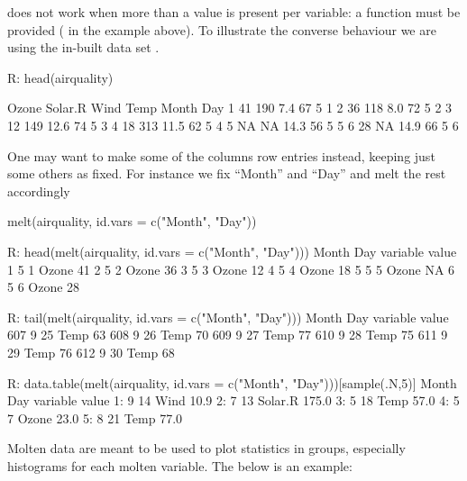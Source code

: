  does not work when more than a value is
present per variable: a function must be provided
( in the example above). To illustrate
the converse behaviour we are using the in-built 
data set .
\begin{example}
R: head(airquality)

  Ozone Solar.R Wind Temp Month Day
1    41     190  7.4   67     5   1
2    36     118  8.0   72     5   2
3    12     149 12.6   74     5   3
4    18     313 11.5   62     5   4
5    NA      NA 14.3   56     5   5
6    28      NA 14.9   66     5   6
\end{example}
One may want to make some of the columns row
entries instead, keeping just some others as
fixed. For instance we fix ``Month'' and 
``Day'' and melt the rest accordingly
\begin{example}
melt(airquality, id.vars = c("Month", "Day")) 
 
R: head(melt(airquality, id.vars = c("Month", "Day")))
  Month Day variable value
1     5   1    Ozone    41
2     5   2    Ozone    36
3     5   3    Ozone    12
4     5   4    Ozone    18
5     5   5    Ozone    NA
6     5   6    Ozone    28

R: tail(melt(airquality, id.vars = c("Month", "Day")))
    Month Day variable value
607     9  25     Temp    63
608     9  26     Temp    70
609     9  27     Temp    77
610     9  28     Temp    75
611     9  29     Temp    76
612     9  30     Temp    68

R: data.table(melt(airquality, id.vars = 
                     c("Month", "Day")))[sample(.N,5)]
   Month Day variable value
1:     9  14     Wind  10.9
2:     7  13  Solar.R 175.0
3:     5  18     Temp  57.0
4:     5   7    Ozone  23.0
5:     8  21     Temp  77.0
\end{example}
Molten data are meant to be used to plot
statistics in groups, especially histograms
for each molten variable. The below is an 
example:
